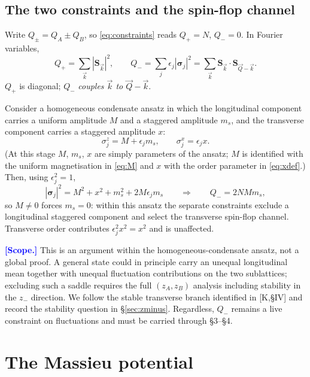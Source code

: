 \documentclass[11pt,a4paper]{article}
\newcommand{\bk}{\vec k}
\newcommand{\bQ}{\vec Q}
\newcommand{\FLAG}[1]{\textcolor{blue}{\textbf{[#1]}}}
\newcommand{\bk}{\vec k}
\newcommand{\bQ}{\vec Q}
\newcommand{\FLAG}[1]{\textcolor{blue}{\textbf{[#1]}}}
\begin{document}
\subsection{The two constraints and the spin-flop channel}
\label{sec:twoconstraints}
Write $Q_\pm=Q_A\pm Q_B$, so \eqref{eq:constraints} reads $Q_+=N$, $Q_-=0$. In Fourier
variables,
\begin{equation}
  Q_+=\sum_{\bk}|\bm S_{\bk}|^2,
  \qquad
  Q_-=\sum_j\epsilon_j|\bm\sigma_j|^2=\sum_{\bk}\bm S_{\bk}\cdot\bm S_{\bQ-\bk} .
  \label{eq:Qpm}
\end{equation}
$Q_+$ is diagonal; $Q_-$ \emph{couples $\bk$ to $\bQ-\bk$}.

Consider a homogeneous condensate ansatz in which the longitudinal component carries a
uniform amplitude $M$ and a staggered amplitude $m_s$, and the transverse component carries
a staggered amplitude $x$:
\begin{equation}
  \sigma^z_j=M+\epsilon_j m_s,\qquad \sigma^x_j=\epsilon_j x .
\end{equation}
(At this stage $M$, $m_s$, $x$ are simply parameters of the ansatz; $M$ is identified with
the uniform magnetisation in \eqref{eq:M} and $x$ with the order parameter in
\eqref{eq:xdef}.) Then, using $\epsilon_j^2=1$,
\begin{equation}
  |\bm\sigma_j|^2=M^2+x^2+m_s^2+2M\epsilon_jm_s
  \qquad\Longrightarrow\qquad
  Q_-=2NMm_s ,
\end{equation}
so $M\neq0$ forces $m_s=0$: within this ansatz the separate constraints exclude a
longitudinal staggered component and select the transverse spin-flop channel. Transverse
order contributes $\epsilon_j^2x^2=x^2$ and is unaffected.

\FLAG{Scope.} This is an argument within the homogeneous-condensate ansatz, not a global
proof. A general state could in principle carry an unequal longitudinal mean together with
unequal fluctuation contributions on the two sublattices; excluding such a saddle requires
the full $(z_A,z_B)$ analysis including stability in the $z_-$ direction. We follow the
stable transverse branch identified in [K,\S IV] and record the stability question in
\S\ref{sec:zminus}. Regardless, $Q_-$ remains a live constraint on fluctuations and must be
carried through \S3--\S4.

\section{The Massieu potential}
\end{document}

